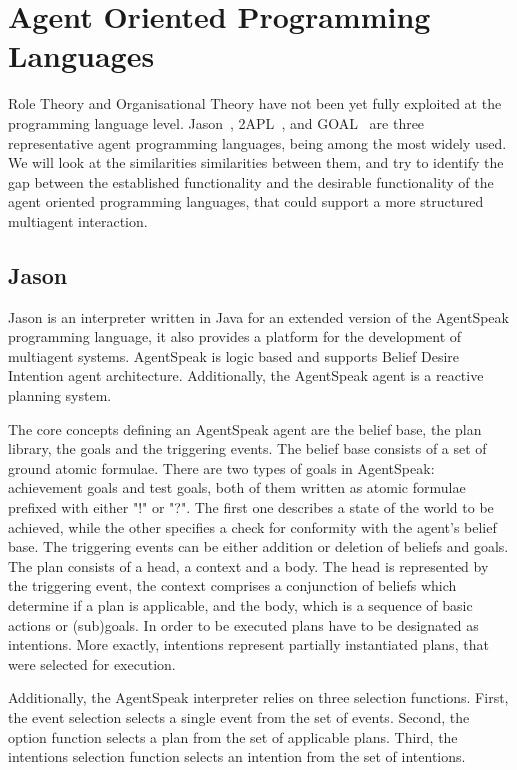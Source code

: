 \documentclass[a4paper,12pt,oneside,fleqn]{book} %
\begin{document}
\section{Agent Oriented Programming Languages} %
Role Theory and Organisational Theory have not been yet fully exploited at
the programming language level.
Jason~\cite{DBLP:books/sp/map2005/BordiniHV05},
2APL~\cite{DBLP:journals/aamas/Dastani08}, and
GOAL~\cite{DBLP:journals/corr/cs-AI-0207008} are three representative agent
programming languages, being among the most widely used. We will look at
the similarities similarities between them, and try to identify the
gap between the established functionality and the desirable functionality of the agent oriented
programming languages, that could support a more structured multiagent
interaction.

\subsection{Jason} %
Jason is an interpreter written in Java for an extended version of the
AgentSpeak programming language, it also provides a platform for the
development of multiagent systems. AgentSpeak is logic based and supports
Belief Desire Intention agent architecture. Additionally, the AgentSpeak
agent is a reactive planning system. 

The core concepts defining an AgentSpeak agent are the belief base, the
plan library, the goals and the triggering events. The belief base consists
of a set of ground atomic formulae. There are two types of goals in
AgentSpeak: achievement goals and test goals, both of them written as
atomic formulae prefixed with either "!" or "?". The first one describes a
state of the world to be achieved, while the other specifies a check for
conformity with the agent's belief base. The triggering events can be
either addition or deletion of beliefs and goals. The plan consists of a
head, a context and a body. The head is represented by the triggering
event, the context comprises a conjunction of beliefs which determine if a
plan is applicable, and the body, which is a sequence of basic actions or
(sub)goals. In order to be executed plans have to be designated as
intentions. More exactly, intentions represent partially instantiated
plans, that were selected for execution.

Additionally, the AgentSpeak interpreter relies on three selection
functions. First, the event selection selects a single event from the set
of events. Second, the option function selects a plan from the set of
applicable plans. Third, the intentions selection function selects an
intention from the set of intentions.
\end{document}
